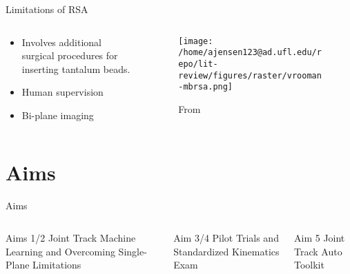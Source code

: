 \documentclass[presentation, aspectratio=1610]{beamer}
\begin{document}
\begin{frame}[label={sec:org0b7fc7a}]{Limitations of RSA}
\begin{columns}
\begin{column}{0.5\columnwidth}
\begin{itemize}
\item Involves additional surgical procedures for inserting tantalum beads.
\item Human supervision
\item Bi-plane imaging
\end{itemize}
\end{column}
\begin{column}{0.6\columnwidth}
\begin{figure}[htbp]
\centering
\texttt{[image: /home/ajensen123@ad.ufl.edu/repo/lit-review/figures/raster/vrooman-mbrsa.png]}
\caption{From \autocite{vroomanFastAccurateAutomated1998}}
\end{figure}
\end{column}
\end{columns}
\end{frame}
\section{Aims}
\label{sec:org36b0efc}
\begin{frame}[label={sec:orgc351f3e}]{Aims}
\begin{columns}
\begin{column}{0.3\columnwidth}
\begin{block}{Aims 1/2}
Joint Track Machine Learning and Overcoming Single-Plane Limitations
\end{block}
\end{column}
\begin{column}{0.3\columnwidth}
\begin{block}{Aim 3/4}
Pilot Trials and Standardized Kinematics Exam
\end{block}
\end{column}
\begin{column}{0.3\columnwidth}
\begin{block}{Aim 5}
Joint Track Auto Toolkit
\end{block}
\end{column}
\end{columns}
\end{frame}
\end{document}
